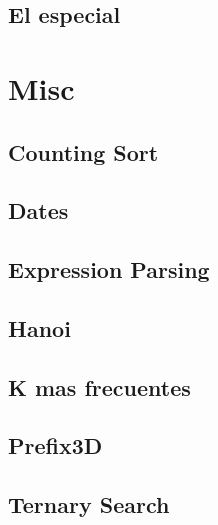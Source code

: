 \subsection{El especial}
\raggedbottom
\hrulefill

\section{Misc}
\subsection{Counting Sort}
\raggedbottom
\hrulefill
\subsection{Dates}
\raggedbottom
\hrulefill
\subsection{Expression Parsing}
\raggedbottom
\hrulefill
\subsection{Hanoi}
\raggedbottom
\hrulefill
\subsection{K mas frecuentes}
\raggedbottom
\hrulefill
\subsection{Prefix3D}
\raggedbottom
\hrulefill
\subsection{Ternary Search}
\raggedbottom
\hrulefill

